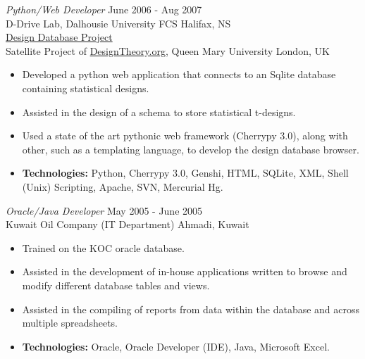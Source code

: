 \documentclass[line,margin]{res}
\begin{document}
\begin{resume}
    {\sl Python/Web Developer} \hfill June 2006 - Aug 2007 \\
    D-Drive Lab, Dalhousie University FCS \hfill Halifax, NS \\
    \href{http://batman.cs.dal.ca/~peter/designdb/}{Design Database Project}\\
    Satellite Project of \href{http://designtheory.org}{DesignTheory.org},
    Queen Mary University \hfill London, UK \smallskip
        \begin{itemize}  \itemsep -2pt %
    \item Developed a python web application that connects to an Sqlite
    database \\ containing statistical designs.
    \item Assisted in the design of a schema to store statistical t-designs.
    \item Used a state of the art pythonic web framework (Cherrypy 3.0),
    along with other, such as a templating language, to develop the design
    database browser.
    \item {\bf Technologies:} \hspace{1pt}
        Python, Cherrypy 3.0, Genshi, HTML, SQLite, XML, \newline
        \hspace*{72pt} Shell (Unix) Scripting, Apache, SVN, Mercurial Hg.
        \end{itemize}

    {\sl Oracle/Java Developer} \hfill May 2005 - June 2005 \\
    Kuwait Oil Company  (IT Department) \hfill  Ahmadi, Kuwait
    \smallskip
        \begin{itemize}  \itemsep -2pt %
    \item Trained on the KOC oracle database.
    \item Assisted in the development of in-house applications written to
        browse and \\ modify different database tables and views.
    \item Assisted in the compiling of reports from data within the database
        and across multiple spreadsheets.
    \item {\bf Technologies:} \hspace{3pt}
        Oracle, Oracle Developer (IDE), Java, Microsoft Excel.
        \end{itemize}


\end{resume}
\end{document}
